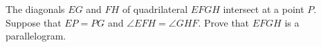 The diagonals $EG$ and $FH$ of quadrilateral $EFGH$ intersect at a point $P$. Suppose that $EP=PG$ and $\angle EFH=\angle GHF$. Prove that $EFGH$ is a parallelogram.
